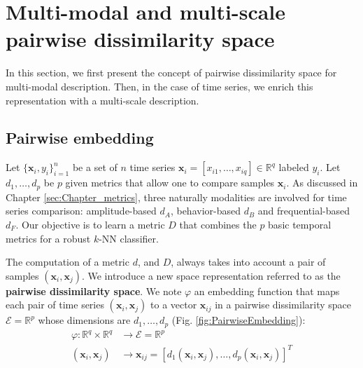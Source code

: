 \newpage
\section{Multi-modal and multi-scale pairwise dissimilarity space}
\label{sec:Pairwise_embedding}
In this section, we first present the concept of pairwise dissimilarity space for multi-modal description. Then, in the case of time series, we enrich this representation with a multi-scale description. 

\subsection{Pairwise embedding}
Let $\{\textbf{x}_{i}, y_{i}\}_{i=1}^n$ be a set of $n$ time series $\textbf{x}_i = [x_{i1}, \ldots, x_{iq}] \in \mathbb{R}^q$ labeled $y_{i}$. Let  $d_1, \ldots , d_p$ be $p$ given metrics that allow one to compare samples $\textbf{x}_{i}$. As discussed in Chapter \ref{sec:Chapter_metrics}, three naturally modalities are involved for time series comparison: amplitude-based $d_A$, behavior-based $d_B$ and frequential-based $d_F$. Our objective is to learn a metric $D$ that combines the $p$ basic temporal metrics for a robust $k$-NN classifier.

The computation of a metric $d$, and $D$, always takes into account a pair of samples $(\textbf{x}_i,\textbf{x}_j)$. We introduce a new space representation referred to as the \textbf{pairwise dissimilarity space}. We note $\varphi$ an embedding function that maps each pair of time
series $(\textbf{x}_i, \textbf{x}_j)$ to a vector $\textbf{x}_{ij}$ in a pairwise dissimilarity space $\mathcal{E} = \mathbb{R}^p$ whose dimensions are $d_1, \ldots, d_p$ (Fig. \ref{fig:PairwiseEmbedding}):
\begin{equation}
\begin{aligned}
\varphi : \mathbb{R}^q \times \mathbb{R}^q & \rightarrow \mathcal{E} = \mathbb{R}^p \\
(\textbf{x}_i, \textbf{x}_j) & \rightarrow \textbf{x}_{ij} = [d_1(\textbf{x}_i, \textbf{x}_j), \ldots, d_p(\textbf{x}_i, \textbf{x}_j)]^T
\end{aligned}
\label{eq:projection}
\end{equation}


